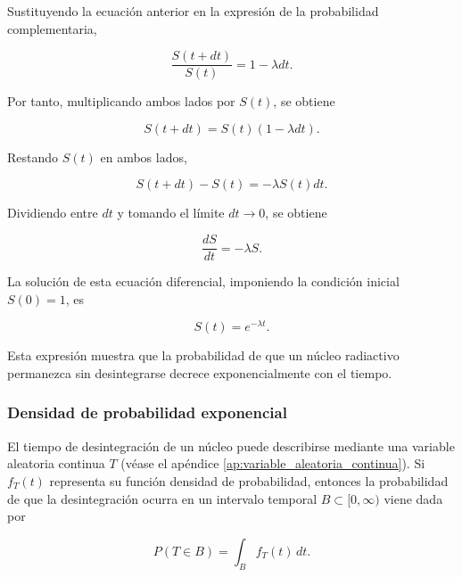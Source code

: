 \documentclass[12pt,a4paper]{article}
\begin{document}
Sustituyendo la ecuación anterior en la expresión de la probabilidad complementaria,

\begin{equation}
    \frac{S(t+dt)}{S(t)}=1-\lambda dt.
\end{equation}

Por tanto, multiplicando ambos lados por $S(t)$, se obtiene

\begin{equation}
    S(t+dt)=S(t)(1-\lambda dt).
\end{equation}

Restando $S(t)$ en ambos lados,

\begin{equation}
    S(t+dt)-S(t)=-\lambda S(t)dt.
\end{equation}

Dividiendo entre $dt$ y tomando el límite $dt\to 0$, se obtiene

\begin{equation}
    \frac{dS}{dt}=-\lambda S.
    \label{eq:diferencial_leysupervivencia}
\end{equation}

La solución de esta ecuación diferencial, imponiendo la condición inicial $S(0)=1$, es

\begin{equation}
    S(t)=e^{-\lambda t}.
    \label{eq:ley_supervivencia}
\end{equation}

Esta expresión muestra que la probabilidad de que un núcleo radiactivo permanezca sin desintegrarse decrece exponencialmente con el tiempo.



\subsubsection{Densidad de probabilidad exponencial}

El tiempo de desintegración de un núcleo puede describirse mediante una variable aleatoria continua $T$ (véase el apéndice \ref{ap:variable_aleatoria_continua}). Si $f_T(t)$ representa su función densidad de probabilidad, entonces la probabilidad de que la desintegración ocurra en un intervalo temporal $B\subset[0,\infty)$ viene dada por

\begin{equation}
    P(T\in B)=\int_B f_T(t)\,dt.
    \label{eq:def_densidad_probabilidad}
\end{equation}
\end{document}
